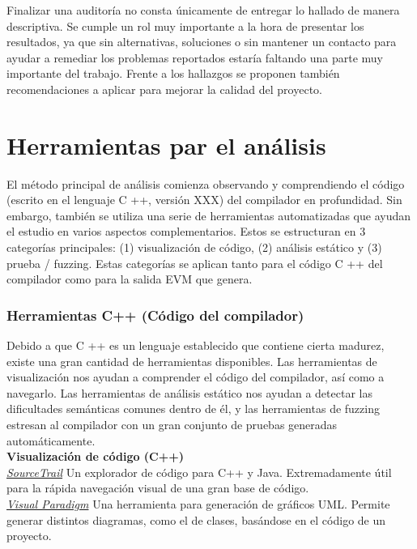 Finalizar una auditoría no consta únicamente de entregar lo hallado de manera descriptiva. Se cumple un rol muy importante a la hora de presentar los resultados, ya que sin alternativas, soluciones o sin mantener un contacto para ayudar a remediar los problemas reportados estaría faltando una parte muy importante del trabajo. Frente a los hallazgos se proponen también recomendaciones a aplicar para mejorar la calidad del proyecto.

\section{Herramientas par el análisis}

El método principal de análisis comienza observando y comprendiendo el código (escrito en el lenguaje C ++, versión XXX) del compilador en profundidad. Sin embargo, también se utiliza una serie de herramientas automatizadas que ayudan el estudio en varios aspectos complementarios. Estos se estructuran en 3 categorías principales: (1) visualización de código, (2) análisis estático y (3) prueba / fuzzing. Estas categorías se aplican tanto para el código C ++ del compilador como para la salida EVM que genera.

\subsubsection{Herramientas C++ (Código del compilador)}

Debido a que C ++ es un lenguaje establecido que contiene cierta madurez, existe una gran cantidad de herramientas disponibles. Las herramientas de visualización nos ayudan a comprender el código del compilador, así como a navegarlo. Las herramientas de análisis estático nos ayudan a detectar las dificultades semánticas comunes dentro de él, y las herramientas de fuzzing estresan al compilador con un gran conjunto de pruebas generadas automáticamente.\\

\textbf{Visualización de código (C++)}\\

\underline{\textit{SourceTrail}}
Un explorador de código para C++ y Java. Extremadamente útil para la rápida navegación visual de una gran base de código.\\

\underline{\textit{Visual Paradigm}}
Una herramienta para generación de gráficos UML. Permite generar distintos diagramas, como el de clases, basándose en el código de un proyecto.\\


